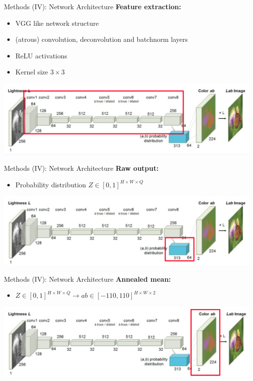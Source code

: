 \documentclass{beamer}
\begin{document}
\begin{frame}{Methods (IV): Network Architecture}
  \textbf{Feature extraction:}
    \begin{itemize}
      \item VGG like network structure
      \item (atrous) convolution, deconvolution and batchnorm layers
      \item ReLU activations
      \item Kernel size $3 \times 3$
    \end{itemize}

  \medskip

  \includegraphics[width=\linewidth]{resources/network2.jpg}
\end{frame}

\begin{frame}{Methods (IV): Network Architecture}
  \textbf{Raw output:}
    \begin{itemize}
      \item Probability distribution $Z \in [0, 1]^{H \times W \times Q}$
    \end{itemize}

  \medskip

  \includegraphics[width=\linewidth]{resources/network3.jpg}
\end{frame}

\begin{frame}{Methods (IV): Network Architecture}
  \textbf{Annealed mean:}
    \begin{itemize}
      \item $Z \in [0, 1]^{H \times W \times Q} \rightarrow ab \in [-110,110]^{H \times W \times 2}$
    \end{itemize}

  \medskip

  \includegraphics[width=\linewidth]{resources/network4.jpg}
\end{frame}
\end{document}
